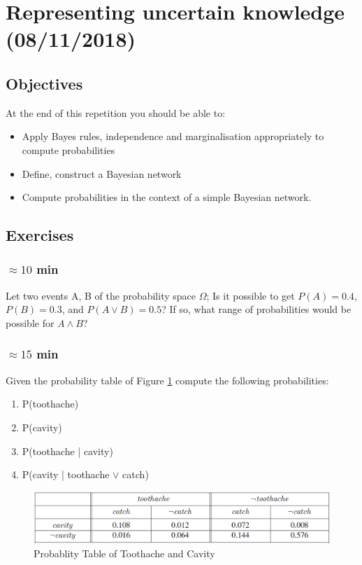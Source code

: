 \documentclass[a4paper, 10pt]{article}
\begin{document}


   \setcounter{page}{1}
   \section{Representing uncertain knowledge (08/11/2018)}
   \subsection{Objectives}
      At the end of this repetition you should be able to:
      \begin{itemize}
          \item Apply Bayes rules, independence and marginalisation appropriately to compute probabilities
          \item Define, construct a Bayesian network
          \item Compute probabilities in the context of a simple Bayesian network.
      \end{itemize}
\subsection{Exercises}
   \subsubsection{$\approx 10$ min}
   Let two events A, B of the probability space $\Omega$; Is it possible to get $P(A)=0.4$, $P(B)=0.3$, and
    $P(A\vee B)=0.5$? If so, what range of probabilities would be possible for $A\wedge B$?
    \subsubsection{$\approx 15$ min}
    Given the probability table of Figure \ref{fig:p_table} compute the following probabilities:
    \begin{enumerate}
        \item P(toothache)
        \item P(cavity)
        \item P(toothache | cavity)
        \item P(cavity | toothache $\vee$ catch)
    \end{enumerate}
    \begin{figure}[H]
        \centering
        \includegraphics[width=1.\textwidth]{figures/proba_table.png}
        \caption{Probablity Table of Toothache and Cavity}
        \label{fig:p_table}
    \end{figure}
\end{document}
